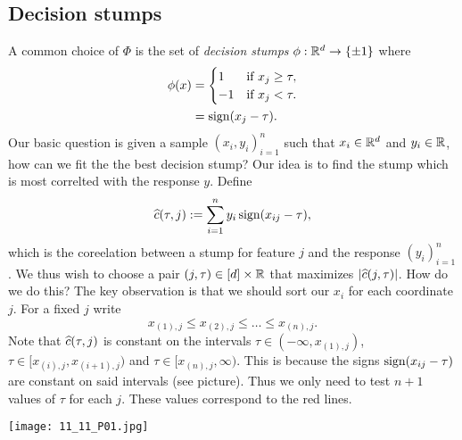 \subsection{Decision stumps}
A common choice of $\Phi$ is the set of \emph{decision stumps} $\phi : {\mathbb R}^d \to \{\pm 1\}$ where 
\begin{align*}
    \phi(x) &= \begin{cases}
        1    & \text{if } x_j \ge \tau,\\
        -1  & \text{if } x_j < \tau.
    \end{cases}\\
    &=\operatorname{sign}(x_j - \tau).
\end{align*}
Our basic question is given a sample $(x_i,y_i)_{i=1}^n$ such that $x_i \in {\mathbb R}^d$ and $y_i \in {\mathbb R}$, how can we fit the the best decision stump? Our idea is to find the stump which is most correlted with the response $y$. Define
\[\widehat{c}(\tau,j) := \sum_{i=1}^n y_i \operatorname{sign}(x_{ij}-\tau),\]
which is the coreelation between a stump for feature $j$ and the response $(y_i)_{i=1}^n$. We thus wish to choose a pair $(j,\tau) \in [d]\times {\mathbb R}$ that maximizes ${\left\lvert\widehat{c}(j,\tau)\right\rvert}$. How do we do this? The key observation is that we should sort our $x_i$ for each coordinate $j$. For a fixed $j$ write
\[x_{(1),j} \le x_{(2),j} \le \ldots \le x_{(n),j}. \]
Note that $\widehat{c}(\tau,j)$ is constant on the intervals $\tau \in (-\infty, x_{(1),j})$, $\tau \in [x_{(i),j},x_{(i+1),j})$ and $\tau \in [x_{(n),j},\infty)$. This is because the signs $\operatorname{sign}(x_{ij}-\tau)$ are constant on said intervals (see picture). Thus we only need to test $n+1$ values of $\tau$ for each $j$. These values correspond to the red lines. 

\begin{center}
    
    \texttt{[image: 11\_11\_P01.jpg]}
\end{center}

